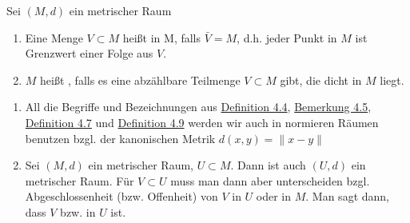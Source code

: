\begin{definition} \label{def:4.9-DichtSeparabel}
	Sei $(M, d)$ ein metrischer Raum
	\begin{enumerate}[label=\alph*\upshape)]
		\item Eine Menge $V \subset M$ hei{\ss}t  in M, falls $\bar V = M$, d.h. jeder Punkt in $M$ ist Grenzwert einer Folge aus $V$.
		\item $M$ hei{\ss}t , falls es eine abzählbare Teilmenge $V \subset M$ gibt, die dicht in $M$ liegt.
	\end{enumerate}
\end{definition}


\begin{bemerkung}
	\begin{enumerate}[label=\alph*\upshape)]
		\item All die Begriffe und Bezeichnungen aus \hyperref[def:4.4-AbgeschlossenOffen-abgoff]{Definition 4.4}, \hyperref[bem:4.5]{Bemerkung 4.5}, \hyperref[def:4.7-AbschlussInnereRand]{Definition 4.7} und \hyperref[def:4.9-DichtSeparabel]{Definition 4.9} werden wir auch in normieren Räumen benutzen bzgl. der kanonischen Metrik $d(x, y) = \| x - y\|$
		\item Sei $(M, d)$ ein metrischer Raum, $U \subset M$. Dann ist auch $(U, d)$ ein metrischer Raum. Für $V \subset U$ muss man dann aber unterscheiden bzgl. Abgeschlossenheit (bzw. Offenheit) von $V$ in $U$ oder in $M$. Man sagt dann, dass $V$  bzw.  in $U$ ist.
	\end{enumerate}	
\end{bemerkung}


